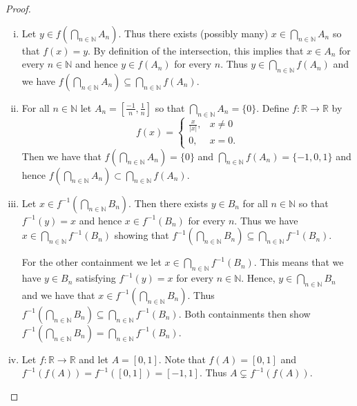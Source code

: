 \documentclass[leqno]{article}
\theoremstyle{nonumberplain}
\newtheorem{proof}{Proof}
\newcommand{\R}{\mathbb{R}}
\newcommand{\N}{\mathbb{N}}
\begin{document}
\begin{proof}~
\begin{enumerate}[(i)]
\item Let $y\in f\left( \bigcap_{n\in \N} A_n \right)$.  Thus there exists (possibly many) $x \in \bigcap_{n\in \N} A_n$ so that $f(x)=y$.  By definition of the intersection, this implies that $x\in A_n$ for every $n\in \N$ and hence $y\in f(A_n)$ for every $n$.  Thus $y\in \bigcap_{n\in \N} f(A_n)$ and we have $f \left( \bigcap_{n\in \N} A_n \right) \subseteq \bigcap_{n\in \N} f(A_n)$.

\item For all $n \in \N$ let $A_n = \left[ \frac{-1}{n}, \frac{1}{n} \right]$ so that $\bigcap_{n\in \N} A_n = \{0\}$. Define $f \colon \R \to \R$ by 
\[
f(x)=
\begin{cases}
\frac{x}{|x|}, & x\neq 0\\
0, & x=0.
\end{cases}
\]
Then we have that $f\left( \bigcap_{n\in \N} A_n \right) = \{0\}$ and $\bigcap_{n\in \N} f(A_n)=\{-1,0,1\}$ and hence $f\left( \bigcap_{n\in \N} A_n \right) \subset \bigcap_{n\in \N} f(A_n)$. 

\item Let $x\in f^{-1}\left(\bigcap_{n\in \N} B_n \right)$. Then there exists $y\in B_n$ for all $n\in \N$ so that $f^{-1}(y)=x$ and hence $x\in f^{-1}(B_n)$ for every $n$. Thus we have $x \in \bigcap_{n \in \N} f^{-1}(B_n)$ showing that $f^{-1}\left( \bigcap_{n\in \N} B_n \right) \subseteq \bigcap_{n\in \N} f^{-1}(B_n)$.  

For the other containment we let $x \in \bigcap_{n\in \N} f^{-1}(B_n)$.  This means that we have $y \in B_n$ satisfying $f^{-1}(y)=x$ for every $n\in \N$. Hence, $y\in \bigcap_{n\in \N} B_n$ and we have that $x\in f^{-1}\left(\bigcap_{n\in \N} B_n \right)$.  Thus $f^{-1}\left( \bigcap_{n\in \N} B_n \right) \subseteq \bigcap_{n\in \N} f^{-1}(B_n)$.  Both containments then show  $f^{-1}(\bigcap_{n \in \mathbb{N}} B_n) = \bigcap_{n \in \mathbb{N}} f^{-1}(B_n)$.

\item Let $f\colon \R \to \R$ and let $A=[0,1]$.  Note that $f(A)=[0,1]$ and $f^{-1}(f(A))=f^{-1}([0,1])=[-1,1]$. Thus $A\subsetneq f^{-1}(f(A))$.
\end{enumerate}
\end{proof}



\pagebreak

\end{document}
